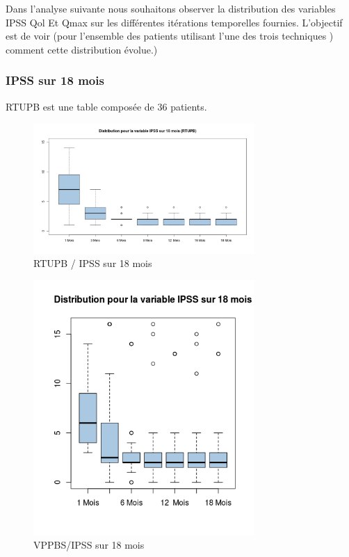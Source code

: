 %
%

Dans l’analyse suivante nous souhaitons observer la distribution des variables IPSS Qol Et Qmax sur les différentes itérations temporelles fournies. L’objectif est de voir (pour l’ensemble des patients utilisant l’une des trois techniques ) comment cette distribution évolue.) 

\subsubsection{IPSS sur 18 mois }

RTUPB est une table composée de 36 patients. 
	
\begin{figure}[H]
\centering
\includegraphics[width=0.75\textwidth]{../Fig/RTUPB/rtupb-boxplot-post-ipss}
\caption{RTUPB / IPSS sur 18 mois}
\end{figure}	
	
\begin{figure}[H]
\centering
\includegraphics[width=0.75\textwidth]{../Fig/VPPBS/vppbs-boxplot-post-ipss}
\caption{VPPBS/IPSS sur 18 mois}
\end{figure}


